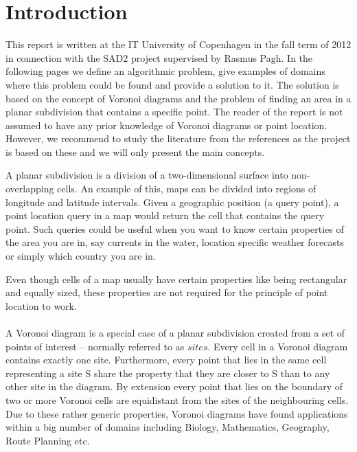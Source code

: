 


\setcounter{page}{1}
\section{Introduction}
\label{introduction}
This report is written at the IT University of Copenhagen in the fall term of 2012 in connection with the SAD2 project supervised by Rasmus Pagh. In the following pages we define an algorithmic problem, give examples of domains where this problem could be found and provide a solution to it. The solution is based on the concept of Voronoi diagrams and the problem of finding an area in a planar subdivision that contains a specific point.
The reader of the report is not assumed to have any prior knowledge of Voronoi diagrams or point location. However, we recommend to study the literature from the references as the project is based on these and we will only present the main concepts.

A planar subdivision is a division of a two-dimensional surface into non-overlapping cells. An example of this, maps can be divided into regions of longitude and latitude intervals. Given a geographic position (a query point), a point location query in a map would return the cell that contains the query point. Such queries could be useful when you want to know certain properties of the area you are in, say currents in the water, location specific weather forecasts or simply which country you are in. 

Even though cells of a map usually have certain properties like being rectangular and equally sized, these properties are not required for the principle of point location to work. 

\paragraph{}
A Voronoi diagram is a special case of a planar subdivision created from a set of points of interest – normally referred to as $sites$. Every cell in a Voronoi diagram contains exactly one site. Furthermore, every point that lies in the same cell representing a site S share the property that they are closer to S than to any other site in the diagram. By extension every point that lies on the boundary of two or more Voronoi cells are equidistant from the sites of the neighbouring cells. Due to these rather generic properties, Voronoi diagrams have found applications within a big number of domains including Biology, Mathematics, Geography, Route Planning etc. 

